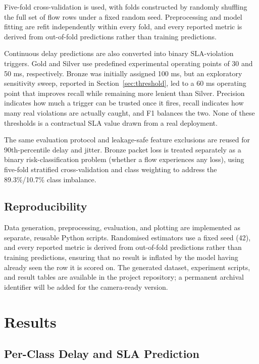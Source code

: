 \documentclass[conference]{IEEEtran}
\begin{document}
Five-fold cross-validation is used, with folds constructed by randomly shuffling the full set of flow rows under a fixed random seed. Preprocessing and model fitting are refit independently within every fold, and every reported metric is derived from out-of-fold predictions rather than training predictions.

Continuous delay predictions are also converted into binary SLA-violation triggers. Gold and Silver use predefined experimental operating points of 30 and 50 ms, respectively. Bronze was initially assigned 100 ms, but an exploratory sensitivity sweep, reported in Section~\ref{sec:threshold}, led to a 60 ms operating point that improves recall while remaining more lenient than Silver. Precision indicates how much a trigger can be trusted once it fires, recall indicates how many real violations are actually caught, and F1 balances the two. None of these thresholds is a contractual SLA value drawn from a real deployment.

The same evaluation protocol and leakage-safe feature exclusions are reused for 90th-percentile delay and jitter. Bronze packet loss is treated separately as a binary risk-classification problem (whether a flow experiences any loss), using five-fold stratified cross-validation and class weighting to address the 89.3\%/10.7\% class imbalance.

\subsection{Reproducibility}

Data generation, preprocessing, evaluation, and plotting are implemented as separate, reusable Python scripts. Randomised estimators use a fixed seed (42), and every reported metric is derived from out-of-fold predictions rather than training predictions, ensuring that no result is inflated by the model having already seen the row it is scored on. The generated dataset, experiment scripts, and result tables are available in the project repository; a permanent archival identifier will be added for the camera-ready version.

\section{Results}

\subsection{Per-Class Delay and SLA Prediction}
\end{document}
